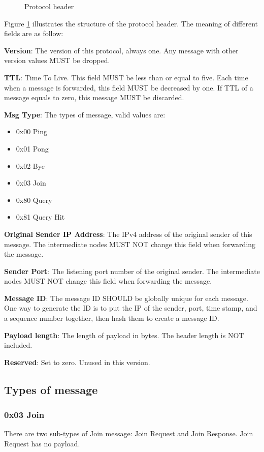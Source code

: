 \documentclass[12pt, a4paper]{article}
\begin{document}
\begin{figure}[h!]
  \centering
  \theverbbox
  \caption{Protocol header}
    \label{fig:header}
\end{figure}

Figure \ref{fig:header} illustrates the structure of the protocol header.
The meaning of different fields are as follow:

\textbf{Version}: The version of this protocol, always one.
Any message with other version values MUST be dropped.

\textbf{TTL}: Time To Live.
This field MUST be less than or equal to five.
Each time when a message is forwarded, this field MUST be decreased by one.
If TTL of a message equals to zero, this message MUST be discarded.

\textbf{Msg Type}: The types of message, valid values are:
\begin{itemize}
\item 0x00 Ping
\item 0x01 Pong
\item 0x02 Bye
\item 0x03 Join
\item 0x80 Query
\item 0x81 Query Hit
\end{itemize}

\textbf{Original Sender IP Address}: The IPv4 address of the original sender of this message.
The intermediate nodes MUST NOT change this field when forwarding the message.

\textbf{Sender Port}: The listening port number of the original sender.
The intermediate nodes MUST NOT change this field when forwarding the message.

\textbf{Message ID}: The message ID SHOULD be globally unique for each message. 
One way to generate the ID is to put the IP of the sender, port, time stamp, and a sequence number together, then hash them to create a message ID.

\textbf{Payload length}: The length of payload in bytes.
The header length is NOT included.

\textbf{Reserved}: Set to zero. Unused in this version.

\subsection{Types of message}
\subsubsection{0x03 Join}
There are two sub-types of Join message: Join Request and Join Response.
Join Request has no payload.
\end{document}
